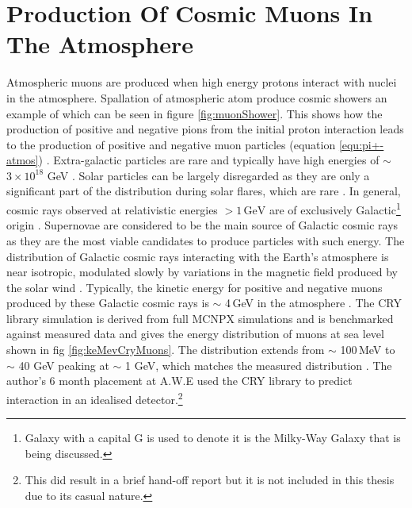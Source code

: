 \section{Production Of Cosmic Muons In The Atmosphere} 
Atmospheric muons are produced when high energy protons interact with nuclei in the atmosphere\cite{griffiths2008neutrinoOscillations}. Spallation of atmospheric atom produce cosmic showers an example of which  can be seen in figure \ref{fig:muonShower}. This shows how the production of positive and negative pions from the initial proton interaction leads to the production of positive and negative muon particles (equation \ref{equ:pi+-atmos}) \cite{griffiths2008neutrinoOscillations}. Extra-galactic particles are rare and typically have high energies of $\sim$ $3 \times 10^{18}$ GeV \cite{Drury2012OCosmicRays} \cite{ieee_cry_2007}. Solar particles can be largely disregarded as they are only a significant part of the distribution during solar flares, which are rare \cite{Zyla_pdg_2020} \cite{ieee_cry_2007}. In general, cosmic rays observed at  relativistic energies $> 1\,\textrm{GeV}$ are of exclusively Galactic\footnote{Galaxy with a capital G is used to denote it is the Milky-Way Galaxy that is being discussed.} origin \cite{Drury2012OCosmicRays}. Supernovae are considered to be the main source of Galactic cosmic rays as they are the most viable candidates to produce particles with such energy\cite{Drury2012OCosmicRays}. The distribution of Galactic cosmic rays interacting with the Earth's atmosphere is near isotropic, modulated slowly by variations in the magnetic field produced by the solar wind \cite{Zyla_pdg_2020}. Typically, the kinetic energy for positive and negative muons produced by these Galactic cosmic rays is $\sim$ 4\,GeV in the atmosphere \cite{Zyla_pdg_2020} \cite{MuonPhysics}. The CRY library simulation is derived from full MCNPX simulations and is benchmarked against measured data and gives the energy distribution of muons at sea level shown in fig \ref{fig:keMevCryMuons}. The distribution extends from $\sim$ 100\,MeV to $\sim$ 40 GeV peaking at $\sim$ 1 GeV, which matches the measured distribution \cite{ieee_cry_2007} \cite{Zyla_pdg_2020}. The author’s 6 month placement at A.W.E used the CRY library to predict interaction in an idealised detector.\footnote{This did result in a brief hand-off report but it is not included in this thesis due to its casual nature.}

